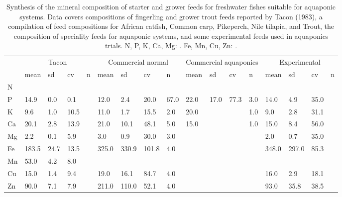 \begin{sidewaystable}
\centering
  \begin{threeparttable}
  
  \caption{Synthesis of the mineral composition of starter and grower feeds for freshwater fishes suitable for aquaponic systems. Data covers compositions of fingerling and grower trout feeds reported by Tacon (1983), a compilation of feed compositions for African catfish, Common carp, Pikeperch, Nile tilapia, and Trout, the composition of speciality feeds for aquaponic systems, and some experimental feeds used in aquaponics trials. N, P, K, Ca, Mg: \si{\gkg}. Fe, Mn, Cu, Zn: \si{\mgkg}.}
  \label{tab:feedcomp}
  
    \begin{tabularx}{\textwidth}{XXXXXXXXXXXXXXXXX}

\toprule

& \multicolumn{4}{c}{Tacon} %
& \multicolumn{4}{c}{Commercial normal} %
& \multicolumn{4}{c}{Commercial aquaponics} %
& \multicolumn{4}{c}{Experimental} %
\\
  \cline{2-5}\cline{6-9}\cline{10-13}\cline{14-17}
  
& mean
& sd  
& cv  
& n 
& mean  
& sd  
& cv  
& n 
& mean  
& sd  
& cv  
& n 
& mean  
& sd  
& cv  
& n 
\\

\midrule

N
&
&
&
&
&
&
&
&
&
&
&
&
&
&
&
&
\\ %
P
& 14.9
& 0.0
& 0.1
&
& 12.0
& 2.4
& 20.0
& 67.0
& 22.0
& 17.0
& 77.3
& 3.0
& 14.0
& 4.9
& 35.0
&
\\ %
K
& 9.6 
& 1.0
& 10.5
& 
& 11.0
& 1.7
& 15.5
& 2.0
& 20.0
& &
& 1.0
& 9.0
& 2.8
& 31.1
&
\\ %
Ca
& 20.1
& 2.8
& 13.9
& 
& 21.0
& 10.1
& 48.1
& 5.0
& 15.0
&
&
& 1.0
& 15.0
& 8.4
& 56.0
&
\\ %
Mg\tnote{*}
& 2.2
& 0.1
& 5.9
&
& 3.0
& 0.9
& 30.0
& 3.0
&
&
&
&
& 2.0
& 0.7
& 35.0
&
\\ %
Fe\tnote{*}
& 183.5
& 24.7
& 13.5
&
& 325.0
& 330.9
& 101.8
& 4.0
&
&
&
&
& 348.0
& 297.0
& 85.3
&
\\ %
Mn\tnote{*}
& 53.0
& 4.2 
& 8.0
&
&
&
&
&
&
&
&
&
&
&
&
&
\\ %
Cu\tnote{*}
& 15.0
& 1.4
& 9.4
&
& 19.0
& 16.1
& 84.7
& 4.0
&
&
&
&
& 16.0
& 2.9
& 18.1
&
\\ %
Zn\tnote{*}
& 90.0
& 7.1
& 7.9
&
& 211.0
& 110.0
& 52.1
& 4.0
& 
&
&
&
& 93.0
& 35.8
& 38.5
&
\\ %


\end{tabularx}
\end{threeparttable}
\end{sidewaystable}
